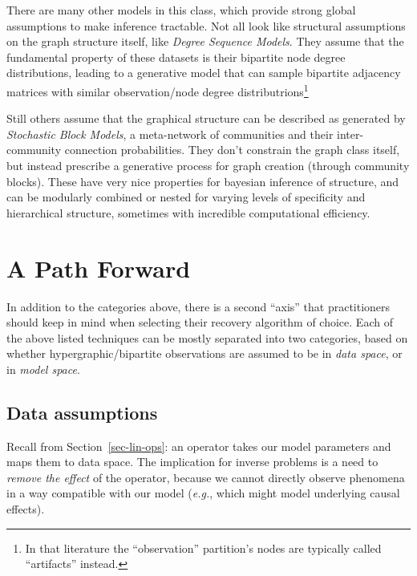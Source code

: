 \documentclass[%
	12pt,
		oneside,
		letterpaper
]{book}
\begin{document}
There are many other models in this class, which provide strong global
assumptions to make inference tractable. Not all look like structural
assumptions on the graph structure itself, like \emph{Degree Sequence
Models}.
\autocite{backbonebipartiteprojections_Neal2014,Comparingalternativesfixed_Neal2021}
They assume that the fundamental property of these datasets is their
bipartite node degree distributions, leading to a generative model that
can sample bipartite adjacency matrices with similar observation/node
degree distributrions\footnote{In that literature the ``observation''
  partition's nodes are typically called ``artifacts'' instead.}

Still others assume that the graphical structure can be described as
generated by \emph{Stochastic Block Models}, a meta-network of
communities and their inter-community connection probabilities. They
don't constrain the graph class itself, but instead prescribe a
generative process for graph creation (through community blocks). These
have very nice properties for bayesian inference of structure, and can
be modularly combined or nested for varying levels of specificity and
hierarchical structure, sometimes with incredible computational
efficiency.
\autocite{ReconstructingNetworksUnknown_Peixoto2018,NetworkReconstructionCommunity_Peixoto2019}

\section{A Path Forward}\label{a-path-forward}

In addition to the categories above, there is a second ``axis'' that
practitioners should keep in mind when selecting their recovery
algorithm of choice. Each of the above listed techniques can be mostly
separated into two categories, based on whether hypergraphic/bipartite
observations are assumed to be in \emph{data space}, or in \emph{model
space}.

\subsection{Data assumptions}\label{data-assumptions}

Recall from Section~\ref{sec-lin-ops}: an operator takes our model
parameters and maps them to data space. The implication for inverse
problems is a need to \emph{remove the effect} of the operator, because
we cannot directly observe phenomena in a way compatible with our model
(\emph{e.g.}, which might model underlying causal effects).
\end{document}
